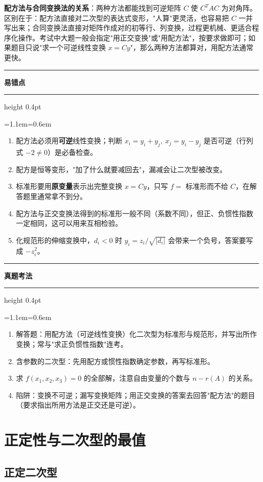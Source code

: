\documentclass[11pt,openany,UTF8]{ctexbook}
\newcommand{\callouthead}[2]{%
  \par\addvspace{7pt}\noindent
  {\color{#1}\rule[-0.15em]{3pt}{1.05em}}\hspace{0.5em}%
  {\bfseries\color{#1}#2}\par\nobreak\vspace{-0.35em}%
  {\color{rulesep}\hrule height 0.4pt}\nobreak\vspace{0.45em}%
  \begingroup\small\setlength{\parindent}{0pt}%
  \leftskip=1.1em\rightskip=0.6em\noindent\ignorespaces}
\newcommand{\calloutend}{\par\endgroup\addvspace{7pt}}
\newenvironment{callwarn}[1]{\callouthead{warnbar}{#1}}{\calloutend}
\newenvironment{callexam}[1]{\callouthead{exambar}{#1}}{\calloutend}
\begin{document}
\textbf{配方法与合同变换法的关系}：两种方法都能找到可逆矩阵 $C$ 使 $C^TAC$ 为对角阵。区别在于：配方法直接对二次型的表达式变形，"人算"更灵活，也容易把 $C$ 一并写出来；合同变换法直接对矩阵作成对的初等行、列变换，过程更机械、更适合程序化操作。考试中大题一般会指定"用正交变换"或"用配方法"，按要求做即可；如果题目只说"求一个可逆线性变换 $x=Cy$"，那么两种方法都算对，用配方法通常更快。

\begin{callwarn}{易错点}
\begin{enumerate}
\item 配方法必须用\textbf{可逆}线性变换；判断 $x_i=y_i+y_j,\ x_j=y_i-y_j$ 是否可逆（行列式 $-2\neq0$）是必备检查。
\item 配方是恒等变形，"加了什么就要减回去"，漏减会让二次型被改变。
\item 标准形要用\textbf{原变量}表示出完整变换 $x=Cy$，只写 $f=$ 标准形而不给 $C$，在解答题里通常拿不到分。
\item 配方法与正交变换法得到的标准形一般不同（系数不同），但正、负惯性指数一定相同，这可以用来互相检验。
\item 化规范形的伸缩变换中，$d_i<0$ 时 $y_i=z_i/\sqrt{\vert d_i\vert}$ 会带来一个负号，答案要写成 $-z_i^2$。
\end{enumerate}
\end{callwarn}

\begin{callexam}{真题考法}
\begin{enumerate}
\item 解答题：用配方法（可逆线性变换）化二次型为标准形与规范形，并写出所作变换；常与"求正负惯性指数"连考。
\item 含参数的二次型：先用配方或惯性指数确定参数，再写标准形。
\item 求 $f(x_1,x_2,x_3)=0$ 的全部解，注意自由变量的个数与 $n-r(A)$ 的关系。
\item 陷阱：变换不可逆；漏写变换矩阵；用正交变换的答案去回答"配方法"的题目（要求指出所用方法是正交还是可逆）。
\end{enumerate}
\end{callexam}

\section{正定性与二次型的最值}

\subsection{正定二次型}
\end{document}

